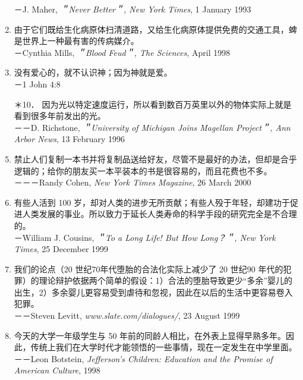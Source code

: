 \begin{enumerate}[label=\arabic*., itemsep=1ex, topsep=1ex, start=2]
    \null\hspace{\parindent}－J. Maher, \textit{＂Never Better＂, New York Times}, 1 January 1993
\item 由于它们既给生化病原体扫清道路，又给生化病原体提供免费的交通工具，蜱是世界上一种最有害的传病媒介。\\
    \null\hspace{\parindent}－Cynthia Mills, \textit{＂Blood Feud＂, The Sciences}, April 1998
\item 没有爱心的，就不认识神；因为神就是爱。\\
    \null\hspace{\parindent}－1 John 4:8
\item[＊10．] 因为光以特定速度运行，所以看到数百万英里以外的物体实际上就是看到很多年前发出的光。\\
    \null\hspace{\parindent}－－D. Richstone, \textit{＂University of Michigan Joins Magellan Project＂, Ann Arbor News}, 13 February 1996
\item 禁止人们复制一本书并将复制品送给好友，尽管不是最好的办法，但却是合乎逻辑的；给你的朋友买一本平装本的书是很容易的，而且花费也不多。\\
    \null\hspace{\parindent}－－－Randy Cohen, \textit{New York Times Magazine}, 26 March 2000
\item 有些人活到 100 岁，却对人类的进步无所贡献；有些人殁于年轻，却建功于促进人类发展的事业。所以致力于延长人类寿命的科学手段的研究完全是不合理的。\\
    \null\hspace{\parindent}－William J. Cousins, \textit{＂To a Long Life! But How Long？＂, New York Times}, 25 December 1999
\item 我们的论点（20 世纪70年代堕胎的合法化实际上减少了 20 世纪90 年代的犯罪）的理论辩护依据两个简单的假设：1）合法的堕胎导致更少“多余”婴儿的出生，2）多余婴儿更容易受到虐待和忽视，因此在以后的生活中更容易卷入犯罪。\\
    \null\hspace{\parindent}－－Steven Levitt, \textit{www.slate.com/dialogues/}, 23 August 1999
\item 今天的大学一年级学生与 50 年前的同龄人相比，在外表上显得早熟多年。因此，传统上我们在大学时代才能领悟的一些事情，现在一定发生在中学里面。\\
    \null\hspace{\parindent}－－Leon Botstein, \textit{Jefferson's Children: Education and the Promise of American Culture}, 1998

\end{enumerate}
